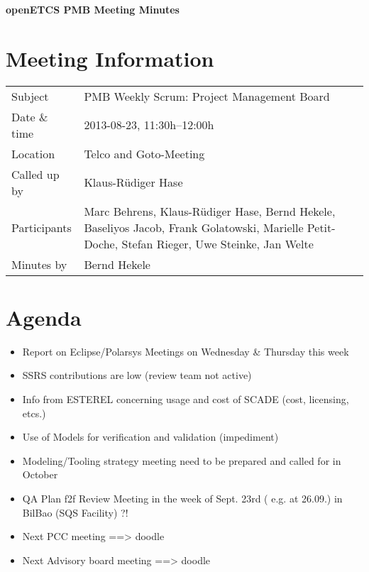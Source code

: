 \documentclass[a4paper, 11pt]{article}
\begin{document}
{\begin{center}\huge\bf openETCS PMB Meeting Minutes\end{center}}
\section{Meeting Information}

\renewcommand{\arraystretch}{1.5}
\begin{supertabular}{m{.2\textwidth}m{.8\textwidth}}
Subject & PMB Weekly Scrum: Project Management Board\\
Date \& time & 2013-08-23, 11:30h--12:00h\\
Location & Telco and Goto-Meeting\\
Called up by & Klaus-R\"udiger Hase\\
Participants &
Marc Behrens,
Klaus-R\"udiger Hase,
Bernd Hekele,
Baseliyos Jacob,
Frank Golatowski,
Marielle Petit-Doche,
Stefan Rieger,
Uwe Steinke,
Jan Welte
\\

Minutes by & Bernd Hekele\\

\end{supertabular}
\renewcommand{\arraystretch}{1.0}


\section{{Agenda}}
\begin{itemize}
\item Report on Eclipse/Polarsys Meetings on Wednesday \& Thursday this week
\item SSRS contributions are low (review team not active)
\item Info from ESTEREL concerning usage and cost of SCADE (cost, licensing, etcs.)
\item Use of Models for verification and validation (impediment)
\item Modeling/Tooling strategy meeting need to be prepared and called for in October 
\item QA Plan f2f Review  Meeting in the week of Sept. 23rd ( e.g. at 26.09.) in BilBao (SQS Facility) ?!
\item Next PCC meeting ==> doodle
\item Next Advisory board meeting ==> doodle
\end{itemize}
\end{document}
